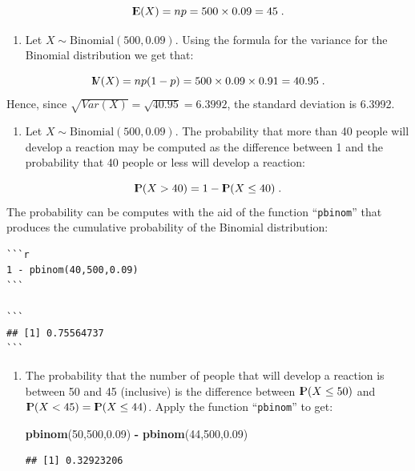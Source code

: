 \documentclass[]{krantz}
\makeatletter
\newenvironment{Shaded}{\begin{snugshade}}{\end{snugshade}}
\newcommand{\DecValTok}[1]{\textcolor[rgb]{0.00,0.00,0.81}{#1}}
\newcommand{\FloatTok}[1]{\textcolor[rgb]{0.00,0.00,0.81}{#1}}
\newcommand{\KeywordTok}[1]{\textcolor[rgb]{0.13,0.29,0.53}{\textbf{#1}}}
\newcommand{\NormalTok}[1]{#1}
\newcommand{\OperatorTok}[1]{\textcolor[rgb]{0.81,0.36,0.00}{\textbf{#1}}}
\newcommand{\StringTok}[1]{\textcolor[rgb]{0.31,0.60,0.02}{#1}}
\providecommand{\tightlist}{%
  \setlength{\itemsep}{0pt}\setlength{\parskip}{0pt}}
\newcommand{\Expec}{{\rm I\kern-.3em E}}
\newcommand{\Prob}{{\rm I\kern-.3em P}}
\newcommand{\Var}{{\rm I\kern-.3em V}}
\newenvironment{kframe}{%
\medskip{}
\setlength{\fboxsep}{.8em}
 \def\at@end@of@kframe{}%
 \ifinner\ifhmode%
  \def\at@end@of@kframe{\end{minipage}}%
  \begin{minipage}{\columnwidth}%
 \fi\fi%
 \def\FrameCommand##1{\hskip\@totalleftmargin \hskip-\fboxsep
 \colorbox{shadecolor}{##1}\hskip-\fboxsep
     \hskip-\linewidth \hskip-\@totalleftmargin \hskip\columnwidth}%
 \MakeFramed {\advance\hsize-\width
   \@totalleftmargin\z@ \linewidth\hsize
   \@setminipage}}%
 {\par\unskip\endMakeFramed%
 \at@end@of@kframe}
\renewenvironment{Shaded}{\begin{kframe}}{\end{kframe}}
\theoremstyle{definition}
\theoremstyle{definition}
\theoremstyle{definition}
\theoremstyle{remark}
\makeatother
\begin{document}
\[\Expec(X) = n p = 500 \times 0.09 = 45\;.\]

\begin{enumerate}
\def\labelenumi{\arabic{enumi}.}
\setcounter{enumi}{1}
\tightlist
\item
  Let
  \(X \sim \mbox{Binomial}(500,0.09)\). Using the formula for the variance
  for the Binomial distribution we get that:
\end{enumerate}

\[\Var(X) = n p(1-p) = 500 \times 0.09\times 0.91 = 40.95\;.\] Hence,
since \(\sqrt{Var(X)} = \sqrt{40.95} = 6.3992\), the standard deviation is
6.3992.

\begin{enumerate}
\def\labelenumi{\arabic{enumi}.}
\setcounter{enumi}{2}
\tightlist
\item
  Let
  \(X \sim \mbox{Binomial}(500,0.09)\). The probability that more than 40
  people will develop a reaction may be computed as the difference between
  1 and the probability that 40 people or less will develop a reaction:
\end{enumerate}

\[\Prob(X > 40) = 1- \Prob(X \leq 40)\;.\] The probability can be
computes with the aid of the function ``\texttt{pbinom}'' that produces the
cumulative probability of the Binomial distribution:

\begin{verbatim}
```r
1 - pbinom(40,500,0.09)
```

```
## [1] 0.75564737
```
\end{verbatim}

\begin{enumerate}
\def\labelenumi{\arabic{enumi}.}
\setcounter{enumi}{3}
\item
  The probability that the number of
  people that will develop a reaction is between 50 and 45 (inclusive) is
  the difference between \(\Prob(X\leq 50)\) and
  \(\Prob(X < 45) = \Prob(X \leq 44)\). Apply the function ``\texttt{pbinom}'' to
  get:

\begin{Shaded}
\begin{Highlighting}[]
\KeywordTok{pbinom}\NormalTok{(}\DecValTok{50}\NormalTok{,}\DecValTok{500}\NormalTok{,}\FloatTok{0.09}\NormalTok{) }\OperatorTok{-}\StringTok{ }\KeywordTok{pbinom}\NormalTok{(}\DecValTok{44}\NormalTok{,}\DecValTok{500}\NormalTok{,}\FloatTok{0.09}\NormalTok{)}
\end{Highlighting}
\end{Shaded}

\begin{verbatim}
## [1] 0.32923206
\end{verbatim}
\end{enumerate}
\end{document}
